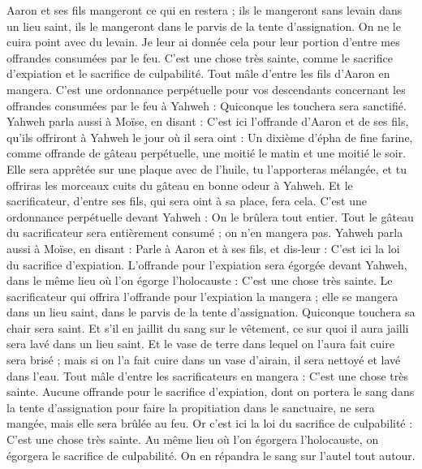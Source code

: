 \begin{multicols}{2}
Aaron et ses fils mangeront ce qui en restera ; ils le mangeront sans levain dans un lieu saint, ils le mangeront dans le parvis de la tente d'assignation.
On ne le cuira point avec du levain. Je leur ai donnée cela pour leur portion d'entre mes offrandes consumées par le feu. C'est une chose très sainte, comme le sacrifice d'expiation et le sacrifice de culpabilité.
Tout mâle d'entre les fils d'Aaron en mangera. C'est une ordonnance perpétuelle pour vos descendants concernant les offrandes consumées par le feu à Yahweh : Quiconque les touchera sera sanctifié.
Yahweh parla aussi à Moïse, en disant :
C'est ici l'offrande d'Aaron et de ses fils, qu'ils offriront à Yahweh le jour où il sera oint : Un dixième d'épha de fine farine, comme offrande de gâteau perpétuelle, une moitié le matin et une moitié le soir.
Elle sera apprêtée sur une plaque avec de l'huile, tu l'apporteras mélangée, et tu offriras les morceaux cuits du gâteau en bonne odeur à Yahweh.
Et le sacrificateur, d'entre ses fils, qui sera oint à sa place, fera cela. C'est une ordonnance perpétuelle devant Yahweh : On le brûlera tout entier.
Tout le gâteau du sacrificateur sera entièrement consumé ; on n'en mangera pas.
Yahweh parla aussi à Moïse, en disant :
Parle à Aaron et à ses fils, et dis-leur : C'est ici la loi du sacrifice d'expiation. L'offrande pour l'expiation sera égorgée devant Yahweh, dans le même lieu où l'on égorge l'holocauste : C'est une chose très sainte.
Le sacrificateur qui offrira l'offrande pour l'expiation la mangera ; elle se mangera dans un lieu saint, dans le parvis de la tente d'assignation.
Quiconque touchera sa chair sera saint. Et s'il en jaillit du sang sur le vêtement, ce sur quoi il aura jailli sera lavé dans un lieu saint.
Et le vase de terre dans lequel on l'aura fait cuire sera brisé ; mais si on l'a fait cuire dans un vase d'airain, il sera nettoyé et lavé dans l'eau.
Tout mâle d'entre les sacrificateurs en mangera : C'est une chose très sainte.
Aucune offrande pour le sacrifice d'expiation, dont on portera le sang dans la tente d'assignation pour faire la propitiation dans le sanctuaire, ne sera mangée, mais elle sera brûlée au feu.
\VerseOne{}Or c'est ici la loi du sacrifice de culpabilité : C'est une chose très sainte.
Au même lieu où l'on égorgera l'holocauste, on égorgera le sacrifice de culpabilité. On en répandra le sang sur l'autel tout autour.

\end{multicols}

